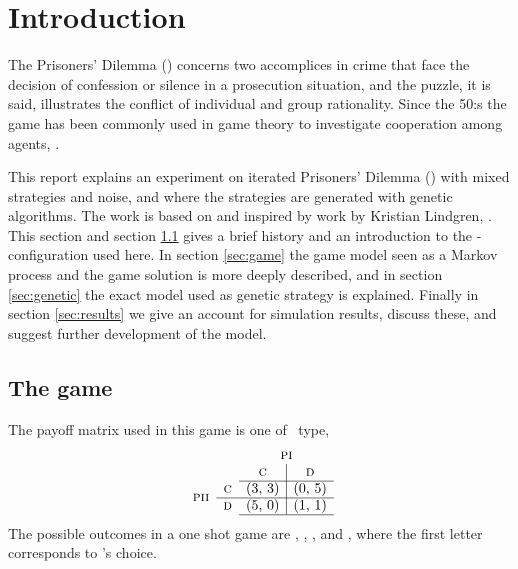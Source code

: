 \section{Introduction}\label{sec:intro}
The Prisoners' Dilemma (\pd) concerns two accomplices in crime that face the decision of confession or silence in a prosecution situation, and the puzzle, it is said, illustrates the conflict of individual and group rationality. Since the 50:s the game has been commonly used in game theory to investigate cooperation among agents, \cite{stanford:pd}.

This report explains an experiment on iterated Prisoners' Dilemma (\ipd) with mixed strategies and noise, and where the strategies are generated with genetic algorithms. The work is based on and inspired by work by Kristian Lindgren, \cite{lindgren:1991}. This section and section \ref{sec:intro:game} gives a brief history and an introduction to the \pd-configuration used here. In section \ref{sec:game} the game model seen as a Markov process and the game solution is more deeply described, and in section \ref{sec:genetic} the exact model used as genetic strategy is explained. Finally in section \ref{sec:results} we give an account for simulation results, discuss these, and suggest further development of the model.

\subsection{The game}\label{sec:intro:game}
The payoff matrix used in this game is one of \pd\ type,
\begin{equation}
\begin{array}{cc c|c}
		     &            & \multicolumn{2}{c}{\pone} \\
		     &            & \textsc{c} & \textsc{d}   \\ \cline{3-4}
\multirow{2}*{\ptwo} & \textsc{c} & $(3, 3)$   & $(0, 5)$     \\ \cline{2-4}
		     & \textsc{d} & $(5, 0)$   & $(1, 1)$     \\ \cline{3-4}
\end{array}
\label{equ:intro:payoff}
\end{equation}
The possible outcomes in a one shot game are , , , and , where the first letter cor\-res\-ponds to \pone's choice.

